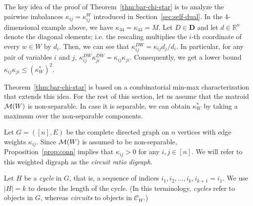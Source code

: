\documentclass[11pt, a4paper]{article}
\newcommand{\Le}{\kappa}
\newcommand{\circuits}{\mathcal{C}}
\newcommand{\1}{\mathbbm{1}}
\theoremstyle{case}
\newcommand{\R}{\mathbb{R}}
\begin{document}
The key idea of the proof of Theorem~\ref{thm:bar-chi-star} is to analyze the pairwise imbalances $\Le_{ij}=\Le^W_{ij}$ introduced in Section~\ref{sec:self-dual}.
In the 4-dimensional example above, we have $\kappa_{34}=\kappa_{43}=M$. Let $D\in {\mathbf D}$ and let $d\in\R^n$ denote the diagonal elements; i.e. the rescaling multiplies the $i$-th coordinate of every $w\in W$ by $d_i$.
Then, we can see that $\Le^{DW}_{ij}=\Le_{ij}d_j/d_i$.
In particular, for any pair of variables $i$ and $j$, $\Le^{DW}_{ij}\Le^{DW}_{ji}=\Le_{ij}\Le_{ji}$. Consequently, we get a lower bound $\Le_{ij}\Le_{ji}\le(\Le^*_W)^2$.

Theorem~\ref{thm:bar-chi-star} is based on a 
combinatorial min-max characterization that extends this idea. For the rest of this section, let us assume that the matroid ${\cal M}(W)$ is non-separable. In case it is separable, we can obtain $\kappa^*_W$ by taking a maximum over the non-separable components. 

Let  $G=([n],E)$ be the complete directed graph on $n$ vertices with 
edge weights $\kappa_{ij}$. Since ${\cal M}(W)$ is assumed to be non-separable, Proposition~\ref{prop:conn} implies that $\kappa_{ij}>0$ for any $i,j\in [n]$.
We will refer to this weighted digraph as  the \emph{circuit ratio digraph}.

Let $H$ be a \emph{cycle} in $G$, that is, a sequence of indices
$i_1,i_2,\dots,i_k, i_{k+1} = i_1$. We use $|H|=k$ to denote the
length of the cycle. (In this terminology, \emph{cycles}  refer to objects in $G$, whereas
\emph{circuits} to objects in $\circuits_W$.)
\end{document}
